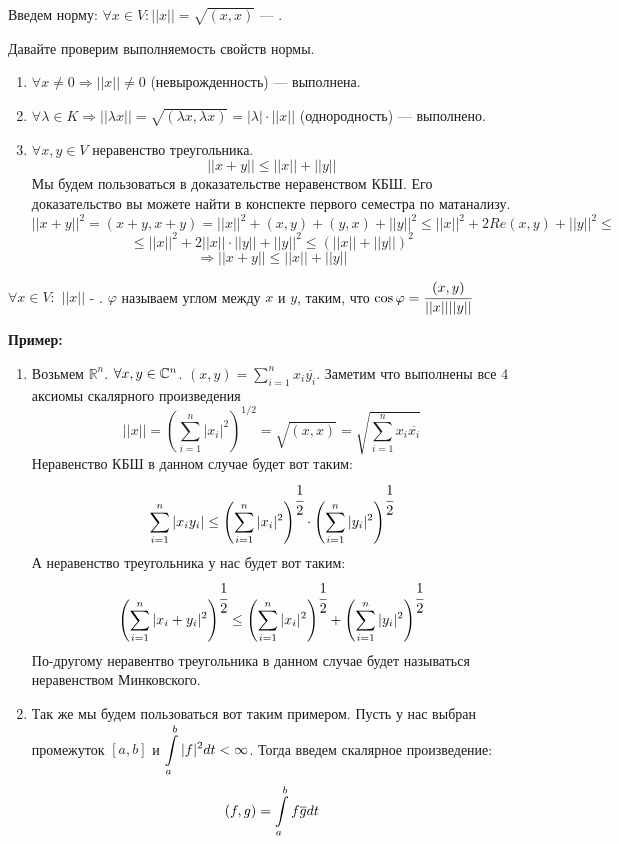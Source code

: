  Введем норму: $\forall x \in V: ||x|| =\sqrt{(x,x)}$ --- .

Давайте проверим выполняемость свойств нормы.

\begin{enumerate} %
    \item $\forall x \neq 0 \Rightarrow ||x|| \neq 0$ (невырожденность) --- выполнена.
    \item  $\forall \lambda \in K \Rightarrow ||\lambda x|| = \sqrt{(\lambda x, \lambda x)} = |\lambda|\cdot||x||$ (однородность) --- выполнено.
    \item  $\forall x, y\in V$ неравенство треугольника. 
    $$||x+y||\leq ||x|| + ||y||$$
    Мы будем пользоваться в доказательстве неравенством КБШ. Его доказательство вы можете найти в конспекте первого семестра по матанализу. 
    $$||x+y||^2 = (x+y,x+y) = ||x||^2 + (x,y) + (y,x) + ||y||^2 \leq ||x||^2 + 2 Re(x,y) + ||y||^2 \leq$$
    $$\leq ||x||^2 + 2||x||\cdot||y|| + ||y||^2 \leq  (||x|| + ||y||)^2$$
    $$\Rightarrow ||x+y|| \leq ||x|| + ||y||$$
\end{enumerate} 

  $\forall x \in V:$ $||x||$ - . $\varphi$ называем углом между $x$ и $y$, таким, что $\cos \varphi = \cfrac{(x,y)}{||x||||y||}$

\textbf{Пример:}

\begin{enumerate}
    \item Возьмем $\mathbb{R}^n$. $\forall x,y \in \mathbb{C}^n$. $(x,y) = \sum\limits_{i=1}^n x_i \overline{y_i}$. Заметим что выполнены все 4 аксиомы скалярного произведения
    $$||x|| = (\sum\limits_{i=1}^n |x_i|^2)^{1/2} = \sqrt{(x,x)} = \sqrt{\sum\limits_{i=1}^n x_i \overline{x_i}}$$
    Неравенство КБШ в данном случае будет вот таким:
    $$\sum\limits_{i=1}^n |x_iy_i| \leq \left(\sum\limits_{i=1}^n |x_i|^2\right)^{\cfrac{1}{2}} \cdot \left ( \sum\limits_{i=1}^{n} |y_i|^2\right)^{\cfrac{1}{2}}$$
    А неравенство треугольника у нас будет вот таким:
    $$\left(\sum\limits_{i=1}^n|x_i+y_i|^2\right)^{\cfrac{1}{2}}\leq \left(\sum\limits_{i=1}^n|x_i|^2\right) ^{\cfrac{1}{2}} + \left(\sum\limits_{i=1}^n |y_i|^2\right)^{\cfrac{1}{2}}$$
    По-другому неравентво треугольника в данном случае будет называться неравенством Минковского.
    \item Так же мы будем пользоваться вот таким примером. Пусть у нас выбран промежуток $[a,b]$ и $\displaystyle\int\limits_{a}^{b}|f|^2dt < \infty$. Тогда введем скалярное произведение: 
    $$(f,g) = \displaystyle\int\limits_{a}^{b} f \overline{g}dt$$
\end{enumerate}

